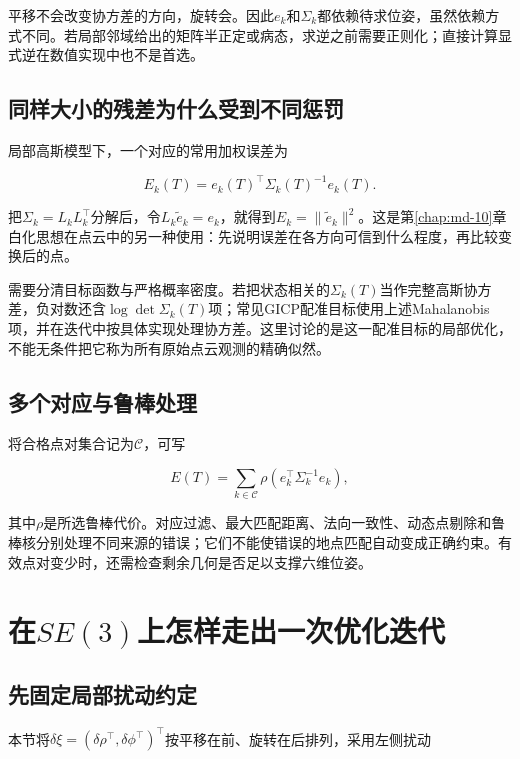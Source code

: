 平移不会改变协方差的方向，旋转会。因此$e_k$和$\Sigma_k$都依赖待求位姿，虽然依赖方式不同。若局部邻域给出的矩阵半正定或病态，求逆之前需要正则化；直接计算显式逆在数值实现中也不是首选。

\subsection{同样大小的残差为什么受到不同惩罚}

局部高斯模型下，一个对应的常用加权误差为

\begin{equation*}
E_k(T)=e_k(T)^\top\Sigma_k(T)^{-1}e_k(T).
\end{equation*}

把$\Sigma_k=L_kL_k^\top$分解后，令$L_k\widetilde e_k=e_k$，就得到$E_k=\|\widetilde e_k\|^2$。这是第\ref{chap:md-10}章白化思想在点云中的另一种使用：先说明误差在各方向可信到什么程度，再比较变换后的点。

需要分清目标函数与严格概率密度。若把状态相关的$\Sigma_k(T)$当作完整高斯协方差，负对数还含$\log\det\Sigma_k(T)$项；常见GICP配准目标使用上述Mahalanobis项，并在迭代中按具体实现处理协方差。这里讨论的是这一配准目标的局部优化，不能无条件把它称为所有原始点云观测的精确似然。

\subsection{多个对应与鲁棒处理}

将合格点对集合记为$\mathcal C$，可写

\begin{equation*}
E(T)=\sum_{k\in\mathcal C}\rho\!\left(e_k^\top\Sigma_k^{-1}e_k\right),
\end{equation*}

其中$\rho$是所选鲁棒代价。对应过滤、最大匹配距离、法向一致性、动态点剔除和鲁棒核分别处理不同来源的错误；它们不能使错误的地点匹配自动变成正确约束。有效点对变少时，还需检查剩余几何是否足以支撑六维位姿。

\section{在$SE(3)$上怎样走出一次优化迭代}

\subsection{先固定局部扰动约定}

本节将$\delta\xi=(\delta\rho^\top,\delta\phi^\top)^\top$按平移在前、旋转在后排列，采用左侧扰动

